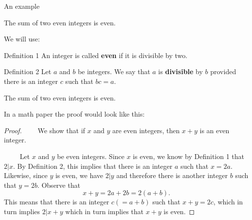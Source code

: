 \documentclass{beamer}
\begin{document}
\begin{frame}{An example}

\begin{theorem}
The sum of two even integers is even.
\end{theorem}\pause
\vspace{0.4cm}
We will use:

\begin{block}{Definition 1}
An integer is called \textbf{even} if it is divisible by two.
\end{block}

\begin{block}{Definition 2}
Let $a$ and $b$ be integers. We say that $a$ is \textbf{divisible} by $b$ provided there is an integer $c$ such that $bc=a$.
\end{block}

\end{frame}

\begin{frame}


\begin{theorem}
The sum of two even integers is even.
\end{theorem}
In a math paper the proof would look like this:
\begin{proof}
~~~~We show that if $x$ and $y$ are even integers, then $x+y$ is an even integer.

~~~~ Let $x$ and $y$ be even integers. Since $x$ is even, we know by Definition 1 that $2|x$. By Definition 2, this implies that there is an integer $a$ such that $x=2a$. Likewise, since $y$ is even, we have $2|y$ and therefore there is another integer $b$ such that $y=2b$. Observe that
\[
x+y=2a+2b=2(a+b).
\]
This means that there is an integer $c(=a+b)$ such that $x+y=2c$, which in turn implies $2|x+y$ which in turn implies that $x+y$ is even.
\end{proof}
\end{frame}
\end{document}
